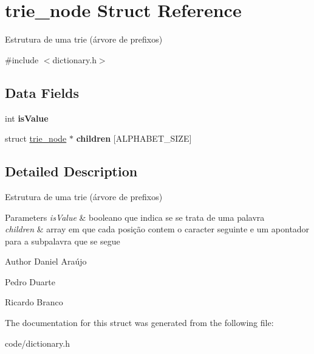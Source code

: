 \hypertarget{structtrie__node}{\section{trie\+\_\+node Struct Reference}
\label{structtrie__node}
}


Estrutura de uma trie (árvore de prefixos)  




{\ttfamily \#include $<$dictionary.\+h$>$}

\subsection*{Data Fields}
\begin{DoxyCompactItemize}
\item 
\hypertarget{structtrie__node_a581570ae1f0b19ebd92d9050d0db9308}{int {\bfseries is\+Value}}\label{structtrie__node_a581570ae1f0b19ebd92d9050d0db9308}

\item 
\hypertarget{structtrie__node_aaffe5ae4ce6f851acc2d1d620720a31d}{struct \hyperlink{structtrie__node}{trie\+\_\+node} $\ast$ {\bfseries children} \mbox{[}A\+L\+P\+H\+A\+B\+E\+T\+\_\+\+S\+I\+Z\+E\mbox{]}}\label{structtrie__node_aaffe5ae4ce6f851acc2d1d620720a31d}

\end{DoxyCompactItemize}


\subsection{Detailed Description}
Estrutura de uma trie (árvore de prefixos) 


\begin{DoxyParams}{Parameters}
{\em is\+Value} & booleano que indica se se trata de uma palavra \\
\hline
{\em children} & array em que cada posição contem o caracter seguinte e um apontador para a subpalavra que se segue \\
\hline
\end{DoxyParams}
\begin{DoxyAuthor}{Author}
Daniel Araújo 

Pedro Duarte 

Ricardo Branco 
\end{DoxyAuthor}


The documentation for this struct was generated from the following file\+:\begin{DoxyCompactItemize}
\item 
code/dictionary.\+h\end{DoxyCompactItemize}
